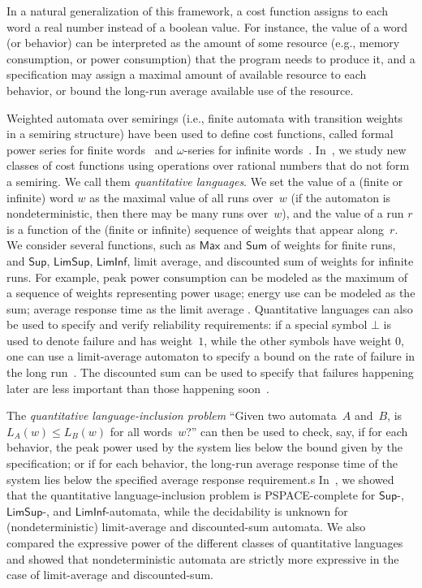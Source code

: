 \documentclass{llncs}
\newcommand{\Maxf}{\mathsf{Max}}
\newcommand{\Max}{\mathsf{Sup}}
\newcommand{\LimSup}{\mathsf{LimSup}}
\newcommand{\LimInf}{\mathsf{LimInf}}
\newcommand{\Sum}{\mathsf{Sum}}
\begin{document}
In a natural generalization of this framework, a cost function
assigns to each word a real number instead of a boolean value. 
For instance, the value of a word (or behavior) can be interpreted as the amount of some resource 
(e.g., memory consumption, or power consumption) that the program needs to produce it,
and a specification may assign a maximal amount of available resource to each 
behavior, or bound the long-run average available use of the resource. 

Weighted automata over semirings (i.e., finite automata with transition weights 
in a semiring structure) have been used to define cost functions, 
called formal power series for finite words~\cite{Wautomata,KuichS86}
and $\omega$-series for infinite words~\cite{CulikK94,DrosteK03,EsikK04}.
In~\cite{CDH08}, we study new classes of cost functions using 
operations over rational numbers that do not form a semiring. 
We call them \emph{quantitative languages}.
We set the value of a (finite or infinite) word $w$ as the maximal value of all runs over~$w$
(if the automaton is nondeterministic, then there may be many runs over~$w$), 
and the value of a run $r$ is a function of the (finite or infinite) sequence 
of weights that appear along~$r$. We consider several 
functions, such as $\Maxf$
and $\Sum$ of weights for finite runs, 
and $\Max$, $\LimSup$, $\LimInf$, limit average, and discounted sum of weights for infinite runs.
For example, peak power consumption can be modeled as the maximum of a sequence 
of weights representing power usage; energy use can be modeled as the sum;
average response time as the limit average \cite{CCHK+05,CAHS03}.
Quantitative languages can also be used to specify and verify reliability 
requirements: if a special symbol $\bot$ is used to denote failure and has 
weight~$1$, while the other symbols have weight $0$, one can use a limit-average 
automaton to specify a bound on the rate of failure in the long run~\cite{CGHIKPS08}.
The discounted sum can be used to specify that failures happening
later are less important than those happening soon~\cite{AHM03}.

The \emph{quantitative language-inclusion problem} ``Given two automata~$A$ and~$B$, 
is $L_{A}(w)\leq L_{B}(w)$ for all words~$w$?'' can then be used to check, say, if for each behavior, 
the peak power used by the system lies below the bound given by the specification; 
or if for each behavior, the long-run average response time of the system
lies below the specified average response requirement.s
In~\cite{CDH08}, we showed that the quantitative language-inclusion problem
is PSPACE-complete for $\Max$-, $\LimSup$-, and $\LimInf$-automata, while
the decidability is unknown for (nondeterministic) limit-average and discounted-sum automata.
We also compared the expressive power of the different classes of quantitative languages
and showed that nondeterministic automata are strictly more expressive in the case of
limit-average and discounted-sum. 
\end{document}
